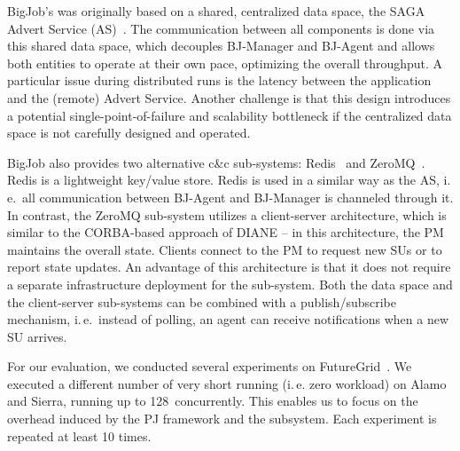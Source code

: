 \documentclass[conference]{IEEEtran}
\begin{document}
BigJob's \cc was originally based on a shared, centralized data space, 
the SAGA Advert Service (AS)~\cite{saga_advert}.  The
communication between all components is done via this shared data
space, which decouples BJ-Manager and BJ-Agent and allows both
entities to operate at their own pace, optimizing the overall
throughput.  A particular issue during distributed runs is the latency
between the application and the (remote) Advert Service. Another
challenge is that this design introduces a potential
single-point-of-failure and scalability bottleneck if the centralized
data space is not carefully designed and operated.

BigJob also provides two alternative c\&c sub-systems:
Redis~\cite{redis} and ZeroMQ~\cite{zmq}. Redis is a lightweight
key/value store. Redis is used in a similar way as the AS, i.\,e.\ all 
communication between BJ-Agent and BJ-Manager is
channeled through it. In contrast, the ZeroMQ sub-system utilizes a
client-server architecture, which is similar to the CORBA-based approach 
of DIANE -- in this architecture, the PM maintains the
overall state. Clients connect to the PM to request new SUs or to
report state updates. An advantage of this architecture is that it
does not require a separate infrastructure deployment for the \cc
sub-system.
%
% 
%
Both the data space and the client-server \cc sub-systems can be
combined with a publish/subscribe mechanism, i.\,e.\ instead of
polling, an agent can receive notifications when a new SU arrives.

For our \cc evaluation, we conducted several experiments on
FutureGrid~\cite{fg}. We executed a different number of very short running
(i.\,e. zero workload) \cus on Alamo and Sierra, running up to 128\,\cus 
concurrently.  This enables us to focus on the overhead induced
by the PJ framework and the \cc subsystem. Each experiment is
repeated at least 10 times.


\end{document}
